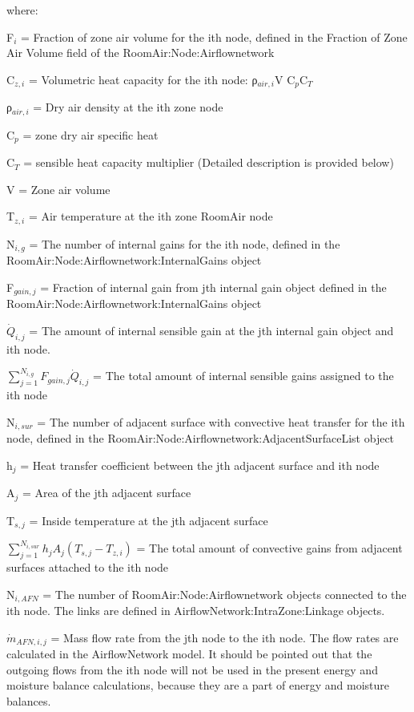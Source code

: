 where:

F\(_{i}\) = Fraction of zone air volume for the ith node, defined in the Fraction of Zone Air Volume field of the RoomAir:Node:Airflownetwork

C\(_{z,i}\) = Volumetric heat capacity for the ith node: ρ\(_{air,i}\)V C\(_{p}\)C\(_{T}\)

ρ\(_{air,i}\) = Dry air density at the ith zone node

C\(_{p}\) = zone dry air specific heat

C\(_{T}\) = sensible heat capacity multiplier (Detailed description is provided below)

V = Zone air volume

T\(_{z,i}\) = Air temperature at the ith zone RoomAir node

N\(_{i,g}\) = The number of internal gains for the ith node, defined in the RoomAir:Node:Airflownetwork:InternalGains object

F\(_{gain,j}\) = Fraction of internal gain from jth internal gain object defined in the RoomAir:Node:Airflownetwork:InternalGains object

\({\dot Q}_{i,j}\) = The amount of internal sensible gain at the jth internal gain object and ith node.

\({\sum\limits_{j = 1}^{N_{i,g}} F_{gain,j}{\dot Q}_{i,j}}\) = The total amount of internal sensible gains assigned to the ith node

N\(_{i,sur}\) = The number of adjacent surface with convective heat transfer for the ith node, defined in the RoomAir:Node:Airflownetwork:AdjacentSurfaceList object

h\(_{j}\) = Heat transfer coefficient between the jth adjacent surface and ith node

A\(_{j}\) = Area of the jth adjacent surface

T\(_{s,j}\) = Inside temperature at the jth adjacent surface

\({\sum\limits_{j = 1}^{N_{i,sur}} h_{j} A_j \left( T_{s,j} - T_{z,i}\right)}\) = The total amount of convective gains from adjacent surfaces attached to the ith node

N\(_{i,AFN}\) = The number of RoomAir:Node:Airflownetwork objects connected to the ith node. The links are defined in AirflowNetwork:IntraZone:Linkage objects.

\({\dot m}_{AFN,i,j}\) = Mass flow rate from the jth node to the ith node. The flow rates are calculated in the AirflowNetwork model. It should be pointed out that the outgoing flows from the ith node will not be used in the present energy and moisture balance calculations, because they are a part of energy and moisture balances.

